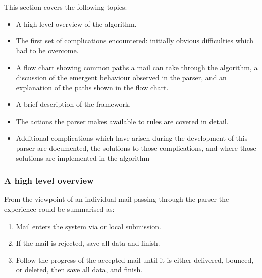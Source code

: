 This section covers the following topics:

\begin{itemize}

    \item A high level overview of the algorithm.

    \item The first set of complications encountered: initially obvious
        difficulties which had to be overcome.

    \item A flow chart showing common paths a mail can take through the
        algorithm, a discussion of the emergent behaviour observed in the
        parser, and an explanation of the paths shown in the flow chart.

    \item A brief description of the framework.

    \item The actions the parser makes available to rules are covered in
        detail.

    \item Additional complications which have arisen during the development
        of this parser are documented, the solutions to those
        complications, and where those solutions are implemented in the
        algorithm

\end{itemize}

\subsubsection{A high level overview}

From the viewpoint of an individual mail passing through the parser the
experience could be summarised as:

\begin{enumerate}

    \item Mail enters the system via \SMTP{} or local submission.

    \item If the mail is rejected, save all data and finish.

    \item Follow the progress of the accepted mail until it is either
        delivered, bounced, or deleted, then save all data, and finish.

\end{enumerate}


